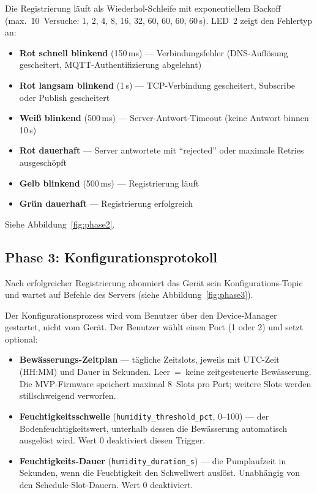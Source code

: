 \documentclass[a4paper,12pt]{article}
\begin{document}
Die Registrierung läuft als Wiederhol-Schleife mit exponentiellem
Backoff (max.\ 10~Versuche: 1, 2, 4, 8, 16, 32, 60, 60, 60, 60\,s).
LED~2 zeigt den Fehlertyp an:

\begin{itemize}
  \item \textbf{Rot schnell blinkend} (150\,ms) --- Verbindungsfehler
        (DNS-Auflösung gescheitert, MQTT-Authentifizierung abgelehnt)
  \item \textbf{Rot langsam blinkend} (1\,s) --- TCP-Verbindung
        gescheitert, Subscribe oder Publish gescheitert
  \item \textbf{Weiß blinkend} (500\,ms) --- Server-Antwort-Timeout
        (keine Antwort binnen 10\,s)
  \item \textbf{Rot dauerhaft} --- Server antwortete mit
        ``rejected'' oder maximale Retries ausgeschöpft
  \item \textbf{Gelb blinkend} (500\,ms) --- Registrierung läuft
  \item \textbf{Grün dauerhaft} --- Registrierung erfolgreich
\end{itemize}

\noindent Siehe Abbildung~\ref{fig:phase2}.

\subsection{Phase 3: Konfigurationsprotokoll}

Nach erfolgreicher Registrierung abonniert das Gerät sein
Konfigurations-Topic und wartet auf Befehle des Servers (siehe
Abbildung~\ref{fig:phase3}).

Der Konfigurationsprozess wird vom Benutzer über den Device-Manager
gestartet, nicht vom Gerät. Der Benutzer wählt einen Port (1 oder 2)
und setzt optional:

\begin{itemize}
  \item \textbf{Bewässerungs-Zeitplan} --- tägliche Zeitslots, jeweils
        mit UTC-Zeit (HH:MM) und Dauer in Sekunden. Leer~=~keine
        zeitgesteuerte Bewässerung. Die MVP-Firmware speichert
        maximal 8~Slots pro Port; weitere Slots werden stillschweigend
        verworfen.
  \item \textbf{Feuchtigkeitsschwelle}
        (\texttt{humidity\_threshold\_pct}, 0--100) --- der
        Bodenfeuchtigkeitswert, unterhalb dessen die
        Bewässerung automatisch ausgelöst wird. Wert 0 deaktiviert
        diesen Trigger.
  \item \textbf{Feuchtigkeits-Dauer}
        (\texttt{humidity\_duration\_s}) --- die Pumplaufzeit in
        Sekunden, wenn die Feuchtigkeit den Schwellwert auslöst.
        Unabhängig von den Schedule-Slot-Dauern. Wert 0 deaktiviert.
\end{itemize}
\end{document}
